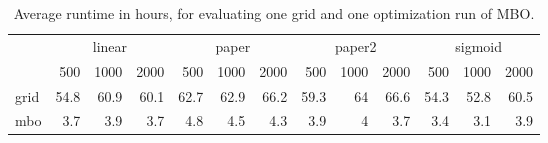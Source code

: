 \begin{table}

\caption{\label{tab:table_time}Average runtime in hours, for evaluating one grid and one optimization run of MBO.}
\centering
\begin{tabular}[t]{lrrrrrrrrrrrr}
\toprule
\multicolumn{1}{c}{ } & \multicolumn{3}{c}{linear} & \multicolumn{3}{c}{paper} & \multicolumn{3}{c}{paper2} & \multicolumn{3}{c}{sigmoid} \\
\cmidrule(l{3pt}r{3pt}){2-4} \cmidrule(l{3pt}r{3pt}){5-7} \cmidrule(l{3pt}r{3pt}){8-10} \cmidrule(l{3pt}r{3pt}){11-13}
 & 500 & 1000 & 2000 & 500 & 1000 & 2000 & 500 & 1000 & 2000 & 500 & 1000 & 2000\\
\midrule
grid & 54.8 & 60.9 & 60.1 & 62.7 & 62.9 & 66.2 & 59.3 & 64 & 66.6 & 54.3 & 52.8 & 60.5\\
mbo & 3.7 & 3.9 & 3.7 & 4.8 & 4.5 & 4.3 & 3.9 & 4 & 3.7 & 3.4 & 3.1 & 3.9\\
\bottomrule
\end{tabular}
\end{table}
